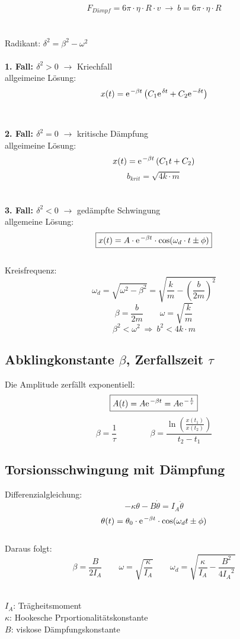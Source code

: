 \[
	F_{Dämpf} = 6\pi \cdot \eta \cdot R \cdot v \ \rightarrow \ b = 6\pi \cdot \eta \cdot R
\]
\\
\\
Radikant: $\delta^2 = \beta^2 - \omega^2$
\\\\
\textbf{1. Fall: $\delta^2 > 0$} $\rightarrow$ Kriechfall\\
allgeimeine Lösung:
\[
	x(t) = \mathrm{e\;\!}^{-\beta t} \left( C_1 \mathrm{e\;\!}^{\delta t} + C_2 \mathrm{e\;\!}^{-\delta t} \right)
\]
\\\\
\textbf{2. Fall: $\delta^2 = 0$} $\rightarrow$ kritische Dämpfung\\
allgeimeine Lösung:
\[
	x(t) = \mathrm{e\;\!}^{-\beta t} \left( C_1 t + C_2 \right)
\]
\[
	b_{krit} = \sqrt{4k\cdot m}
\]
\\\\
\textbf{3. Fall: $\delta^2 < 0$} $\rightarrow$ gedämpfte Schwingung\\
allgemeine Lösung:
\[\boxed{
	x(t)=A \cdot \mathrm{e\;\!}^{-\beta t} \cdot \cos(\omega_d \cdot t \pm \phi)
}\]
\\
Kreisfrequenz:
\[\boxed{
	\omega_d = \sqrt{\omega^2 - \beta^2} = \sqrt{\frac{k}{m} - \left( \frac{b}{2m} \right)^2}
}\]
\[
	\beta=\frac{b}{2m} \qquad \omega = \sqrt{\frac{k}{m}}
\]
\[
	\beta^2 < \omega^2 \ \Rightarrow \ b^2 < 4k \cdot m
\]

\subsection{Abklingkonstante $\beta$, Zerfallszeit $\tau$}
Die Amplitude zerfällt exponentiell:
\[\boxed{
	A(t) = A \mathrm{e\;\!}^{-\beta t} = A \mathrm{e\;\!}^{-\frac{t}{\tau}}
}\]
\[
	\beta = \frac{1}{\tau} \qquad\qquad \beta = \frac{\ln \left( \frac{x(t_1)}{x(t_2)} \right)}{t_2-t_1}
\]


\subsection{Torsionsschwingung mit Dämpfung}
Differenzialgleichung:
\[
	-\kappa\theta-B\dot{\theta} = I_A \ddot{\theta}
\]
\[
	\theta(t) = \theta_0 \cdot \mathrm{e\;\!}^{-\beta t} \cdot \cos(\omega_d t \pm \phi)
\]
\\
Daraus folgt:
\[
	\beta = \frac{B}{2I_A} \qquad \omega = \sqrt{\frac{\kappa}{I_A}} \qquad \omega_d = \sqrt{\frac{\kappa}{I_A} - \frac{B^2}{4{I_A}^2}}
\]
\\
\begin{footnotesize}
	$I_{A}$: Trägheitsmoment\\
	$\kappa$: Hookesche Prportionalitätskonstante \\
	$B$: viskose Dämpfungskonstante
\end{footnotesize}


